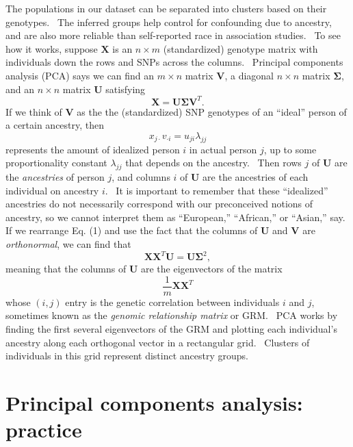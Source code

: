 \documentclass[
]{book}
\begin{document}
The populations in our dataset can be separated into clusters based on their genotypes.~ The inferred groups help control for confounding due to ancestry, and are also more reliable than self-reported race in association studies.~ To see how it works, suppose \(\mathbf{X}\) is an \(n\times m\) (standardized) genotype matrix with individuals down the rows and SNPs across the columns.~ Principal components analysis (PCA) says we can find an \(m\times n\) matrix \(\mathbf{V}\), a diagonal \(n\times n\) matrix \(\mathbf{\Sigma}\), and an \(n\times n\) matrix \(\mathbf{U}\) satisfying \begin{equation}\mathbf{X}=\mathbf{U}\mathbf{\Sigma}\mathbf{V}^T.\tag{1}\end{equation} If we think of \(\mathbf{V}\) as the the (standardized) SNP genotypes of an ``ideal'' person of a certain ancestry, then \begin{equation}x_{j\cdot} v_{\cdot i}=u_{ji}\lambda_{jj}\end{equation} represents the amount of idealized person \(i\) in actual person \(j\), up to some proportionality constant \(\lambda_{jj}\) that depends on the ancestry.~ Then rows \(j\) of \(\mathbf{U}\) are the \emph{ancestries} of person \(j\), and columns \(i\) of \(\mathbf{U}\) are the ancestries of each individual on ancestry \(i\).~ It is important to remember that these ``idealized'' ancestries do not necessarily correspond with our preconceived notions of ancestry, so we cannot interpret them as ``European,'' ``African,'' or ``Asian,'' say.~ If we rearrange Eq. (1) and use the fact that the columns of \(\mathbf{U}\) and \(\mathbf{V}\) are \emph{orthonormal}, we can find that \begin{equation}\mathbf{X}\mathbf{X}^T\mathbf{U}=\mathbf{U}\mathbf{\Sigma}^2,\end{equation} meaning that the columns of \(\mathbf{U}\) are the eigenvectors of the matrix \begin{equation}\frac{1}{m}\mathbf{X}\mathbf{X}^T\tag{2}\end{equation} whose \(\left(i,j\right)\) entry is the genetic correlation between individuals \(i\) and \(j\), sometimes known as the \emph{genomic relationship matrix} or GRM.~ PCA works by finding the first several eigenvectors of the GRM and plotting each individual's ancestry along each orthogonal vector in a rectangular grid.~ Clusters of individuals in this grid represent distinct ancestry groups.

\hypertarget{principal-components-analysis-practice}{%
\section{Principal components analysis: practice}\label{principal-components-analysis-practice}}
\end{document}
